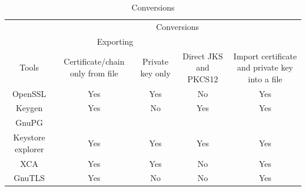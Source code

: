 \documentclass[10pt, a4paper]{report}
\begin{document}
\begin{table}[h!]
\centering
\caption{Conversions}
\label{my-label}
\begin{adjustbox}{max width=\textwidth}
\begin{tabular}{|c|c|c|c|c|}
\hline
                        & \multicolumn{4}{c|}{Conversions}                                                                                                                                            \\ \cline{2-5} 
                        & \multicolumn{2}{c|}{Exporting}                                 &                                         &                                                                  \\ \cline{2-3}
\multirow{-3}{*}{Tools} & Certificate/chain only from file & Private key only            & \multirow{-2}{*}{Direct JKS and PKCS12} & \multirow{-2}{*}{Import certificate and private key into a file} \\ \hline
OpenSSL                 & \cellcolor[HTML]{34FF34}Yes      & \cellcolor[HTML]{34FF34}Yes & \cellcolor[HTML]{FF3A3A}No              & \cellcolor[HTML]{34FF34}Yes                                      \\ \hline
Keygen                  & \cellcolor[HTML]{34FF34}Yes      & \cellcolor[HTML]{FE0000}No  & \cellcolor[HTML]{34FF34}Yes             & \cellcolor[HTML]{34FF34}Yes                                      \\ \hline
GnuPG                   &                                  &                             &                                         &                                                                  \\ \hline
Keystore explorer       & \cellcolor[HTML]{34FF34}Yes      & \cellcolor[HTML]{34FF34}Yes & \cellcolor[HTML]{34FF34}Yes             & \cellcolor[HTML]{34FF34}Yes                                      \\ \hline
XCA                     & \cellcolor[HTML]{34FF34}Yes      & \cellcolor[HTML]{34FF34}Yes & \cellcolor[HTML]{FF3A3A}No              & \cellcolor[HTML]{34FF34}Yes                                      \\ \hline
GnuTLS                  & \cellcolor[HTML]{34FF34}Yes      & \cellcolor[HTML]{FF3A3A}No  & \cellcolor[HTML]{FF3A3A}No              & \cellcolor[HTML]{34FF34}Yes                                      \\ \hline
\end{tabular}
\end{adjustbox}
\end{table}
\end{document}
